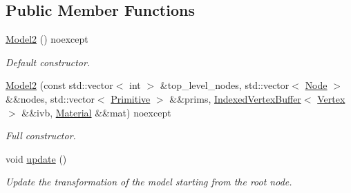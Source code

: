 \subsection*{Public Member Functions}
\begin{DoxyCompactItemize}
\item 
\mbox{\label{classblaze_1_1Model2_a3122286acb99b24250c3ef919b0e3d9b}} 
\hyperlink{classblaze_1_1Model2_a3122286acb99b24250c3ef919b0e3d9b}{Model2} () noexcept
\begin{DoxyCompactList}\small\item\em Default constructor. \end{DoxyCompactList}\item 
\hyperlink{classblaze_1_1Model2_a1417c8c21b0003a068e20405f3b8e22c}{Model2} (const std\+::vector$<$ int $>$ \&top\+\_\+level\+\_\+nodes, std\+::vector$<$ \hyperlink{structblaze_1_1Node}{Node} $>$ \&\&nodes, std\+::vector$<$ \hyperlink{structblaze_1_1Primitive}{Primitive} $>$ \&\&prims, \hyperlink{classblaze_1_1IndexedVertexBuffer}{Indexed\+Vertex\+Buffer}$<$ \hyperlink{structblaze_1_1Vertex}{Vertex} $>$ \&\&ivb, \hyperlink{structblaze_1_1Model2_1_1Material}{Material} \&\&mat) noexcept
\begin{DoxyCompactList}\small\item\em Full constructor. \end{DoxyCompactList}\item 
\mbox{\label{classblaze_1_1Model2_a05ebcffe0281b9cba1518fd9406e6911}} 
void \hyperlink{classblaze_1_1Model2_a05ebcffe0281b9cba1518fd9406e6911}{update} ()
\begin{DoxyCompactList}\small\item\em Update the transformation of the model starting from the root node. \end{DoxyCompactList}\end{DoxyCompactItemize}
